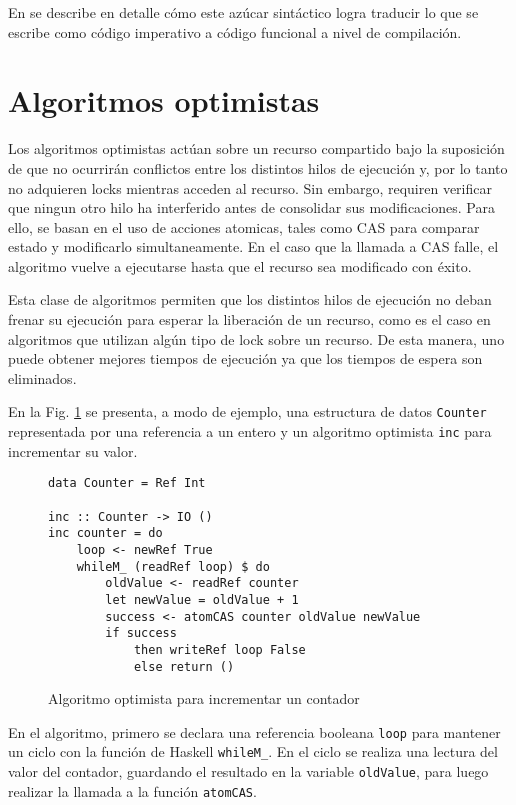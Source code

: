 En \cite{do-notation} se describe en detalle cómo este azúcar sintáctico logra traducir lo que se escribe como código imperativo a código funcional a nivel de compilación.

\section{Algoritmos optimistas}\label{sec:lockfree}
Los algoritmos optimistas actúan sobre un recurso compartido bajo la suposición de que no ocurrirán conflictos entre los distintos hilos de ejecución y, por lo tanto no adquieren locks mientras acceden al recurso. Sin embargo, requiren verificar que ningun otro hilo ha interferido antes de consolidar sus modificaciones. Para ello, se basan en el uso de acciones atomicas, tales como CAS para comparar estado y modificarlo simultaneamente.
En el caso que la llamada a CAS falle, el algoritmo vuelve a ejecutarse hasta que el recurso sea modificado con éxito.

Esta clase de algoritmos permiten que los distintos hilos de ejecución no deban frenar su ejecución para esperar la liberación de un recurso, como es el caso en algoritmos que utilizan algún tipo de lock sobre un recurso.
De esta manera, uno puede obtener mejores tiempos de ejecución ya que los tiempos de espera son eliminados.

En la Fig. \ref{fig:lockfree-counter-example} se presenta, a modo de ejemplo, una estructura de datos \texttt{Counter} representada por una referencia a un entero y un algoritmo optimista \texttt{inc} para incrementar su valor.

\begin{figure}[!h]
\begin{verbatim}
data Counter = Ref Int

inc :: Counter -> IO ()
inc counter = do
    loop <- newRef True
    whileM_ (readRef loop) $ do
        oldValue <- readRef counter
        let newValue = oldValue + 1
        success <- atomCAS counter oldValue newValue
        if success
            then writeRef loop False
            else return ()
\end{verbatim}
\caption{Algoritmo optimista para incrementar un contador}
\label{fig:lockfree-counter-example}
\end{figure}

En el algoritmo, primero se declara una referencia booleana \texttt{loop} para mantener un ciclo con la función de Haskell \texttt{whileM\_}.
En el ciclo se realiza una lectura del valor del contador, guardando el resultado en la variable \texttt{oldValue}, para luego realizar la llamada a la función \texttt{atomCAS}.

